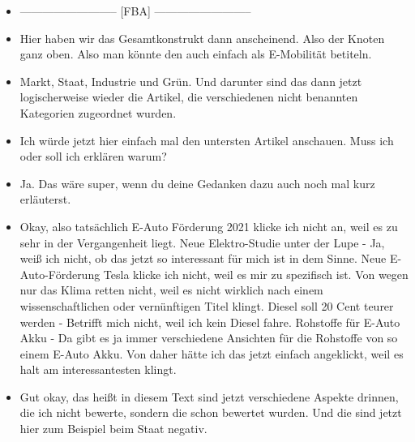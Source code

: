 {\begin{itemize}[]
    Das finde ich am schwierigsten zu verstehen.
    Ich will es mir trotzdem noch mal ganz kurz durchlesen, vielleicht wird es klarer, wenn ich es nochmal lese.
    Die Liste enthält alle Artikel, welche zur ausgewählten Kategorie passen.
    Für jede weitere Kategorie wird in der Liste plus eins gerechnet.
    Also eins sind dann alle, die hier sind.
    Warum ich jetzt hier auf die zwei kam, war eben genau, weil ich dann quasi plus eins plus noch mal eins gehe, weil ich das ja noch als Knoten sehe.
    Der hat zwar keine Betitelung, aber deswegen hätte ich da jetzt irgendwie so intuitiv noch eine zwei vermutet.
    \item {--------------------------} [FBA] {--------------------------}
    \item {} Hier haben wir das Gesamtkonstrukt dann anscheinend. 
    Also der Knoten ganz oben. 
    Also man könnte den auch einfach als E-Mobilität betiteln.
    \item {} Markt, Staat, Industrie und Grün.
    Und darunter sind das dann jetzt logischerweise wieder die Artikel, die verschiedenen nicht benannten Kategorien zugeordnet wurden.
    \item {} Ich würde jetzt hier einfach mal den untersten Artikel anschauen. Muss ich oder soll ich erklären warum?
    \item {} Ja. Das wäre super, wenn du deine Gedanken dazu auch noch mal kurz erläuterst. 
    \item {} Okay, also tatsächlich \flqq E-Auto Förderung 2021\frqq{} klicke ich nicht an, weil es zu sehr in der Vergangenheit liegt.
    \flqq Neue Elektro-Studie unter der Lupe\frqq{} - Ja, weiß ich nicht, ob das jetzt so interessant für mich ist in dem Sinne.
    \flqq Neue E-Auto-Förderung Tesla\frqq{} klicke ich nicht, weil es mir zu spezifisch ist.
    \flqq Von wegen nur das Klima retten\frqq{} nicht, weil es nicht wirklich nach einem wissenschaftlichen oder vernünftigen Titel klingt.
    \flqq Diesel soll 20 Cent teurer werden\frqq{} - Betrifft mich nicht, weil ich kein Diesel fahre.
    \flqq Rohstoffe für E-Auto Akku\frqq{} - Da gibt es ja immer verschiedene Ansichten für die Rohstoffe von so einem E-Auto Akku.
    Von daher hätte ich das jetzt einfach angeklickt, weil es halt am interessantesten klingt.
    \item {} Gut okay, das heißt in diesem Text sind jetzt verschiedene Aspekte drinnen, die ich nicht bewerte, sondern die schon bewertet wurden.
    Und die sind jetzt hier zum Beispiel beim Staat negativ. 

\end{itemize}}
